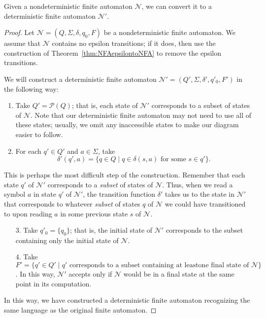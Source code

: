 \begin{theorem}\label{thm:NFAtoDFA}
Given a nondeterministic finite automaton $\mathcal{N}$, we can convert it to a deterministic finite automaton $\mathcal{N}'$.

\begin{proof}
Let $\mathcal{N} = (Q, \Sigma, \delta, q_{0}, F)$ be a nondeterministic finite automaton. We assume that $\mathcal{N}$ contains no epsilon transitions; if it does, then use the construction of Theorem~\ref{thm:NFAepsilontoNFA} to remove the epsilon transitions.

We will construct a deterministic finite automaton $\mathcal{N}' = (Q', \Sigma, \delta', q'_{0},\allowbreak F')$ in the following way:
\begin{enumerate}
\item Take $Q' = \mathcal{P}(Q)$; that is, each state of $\mathcal{N}'$ corresponds to a subset of states of $\mathcal{N}$. Note that our deterministic finite automaton may not need to use all of these states; usually, we omit any inaccessible states to make our diagram easier to follow.
\item For each $q' \in Q'$ and $a \in \Sigma$, take
	\begin{equation*}
	\delta'(q', a) = \{q \in Q \mid q \in \delta(s, a) \text{ for some } s \in q'\}.
	\end{equation*}
\end{enumerate}
\begin{dangerous}
This is perhaps the most difficult step of the construction. Remember that each state $q'$ of $\mathcal{N}'$ corresponds to a \emph{subset} of states of $\mathcal{N}$. Thus, when we read a symbol $a$ in state $q'$ of $\mathcal{N}'$, the transition function $\delta'$ takes us to the state in $\mathcal{N}'$ that corresponds to whatever \emph{subset} of states $q$ of $\mathcal{N}$ we could have transitioned to upon reading $a$ in some previous state $s$ of $\mathcal{N}$.
\end{dangerous}
\begin{enumerate}
\item[3.] Take $q'_{0} = \{q_{0}\}$; that is, the initial state of $\mathcal{N}'$ corresponds to the subset containing only the initial state of $\mathcal{N}$.
\item[4.] Take $F' = \{q' \in Q' \mid q' \text{ corresponds to a subset containing at least} \allowbreak \text{one final state of } \mathcal{N}\}$. In this way, $\mathcal{N}'$ accepts only if $\mathcal{N}$ would be in a final state at the same point in its computation.
\end{enumerate}
In this way, we have constructed a deterministic finite automaton recognizing the same language as the original finite automaton.
\end{proof}
\end{theorem}

